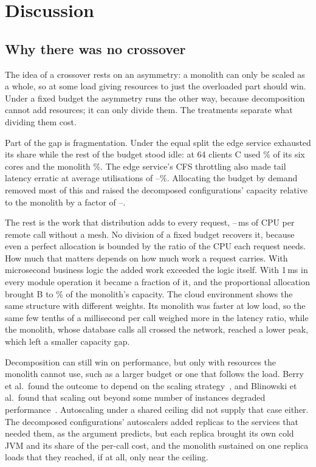 \section{Discussion}
\label{sec:discussion}

\subsection{Why there was no crossover}

The idea of a crossover rests on an asymmetry: a monolith can only be scaled as a whole, so at some load giving
resources to just the overloaded part should win. Under a fixed budget the asymmetry runs the other way, because
decomposition cannot add resources; it can only divide them. The treatments separate what dividing them cost.

Part of the gap is fragmentation. Under the equal split the edge service exhausted its share while the rest of the
budget stood idle: at 64 clients C used \% of its six cores and the monolith
\%. The edge service's CFS throttling also made tail latency erratic at average utilisations
of --\%. Allocating the budget by demand removed most of this and
raised the decomposed configurations' capacity relative to the monolith by a factor of
--.

The rest is the work that distribution adds to every request, --\,ms
of CPU per remote call without a mesh. No division of a fixed budget recovers it, because even a perfect allocation
is bounded by the ratio of the CPU each request needs. How much that matters depends on how much work a request
carries. With microsecond business logic the added work exceeded the logic itself. With 1\,ms in every module
operation it became a fraction of it, and the proportional allocation brought B to \% of
the monolith's capacity. The cloud environment shows the same structure with different weights. Its monolith was faster at low load, so the same few tenths of a millisecond per call weighed more in the
latency ratio, while the monolith, whose database calls all crossed the network, reached a lower peak, which left a
smaller capacity gap.

Decomposition can still win on performance, but only with resources the
monolith cannot use, such as a larger budget or one that follows the load. Berry et al.\ found the outcome to depend
on the scaling strategy~\cite{Berry2024}, and Blinowski et al.\ found that scaling out beyond some number of
instances degraded performance~\cite{Blinowski2022}.
Autoscaling under a shared ceiling did not supply that case either. The decomposed configurations' autoscalers
added replicas to the services that needed them, as the argument predicts, but each replica brought its own cold
JVM and its share of the per-call cost, and the monolith sustained on one replica loads that they reached, if at all, only near the ceiling.

